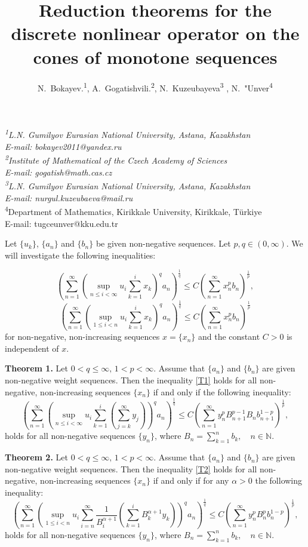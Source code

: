 \documentclass[12pt]{article}
\title{Reduction theorems for the discrete nonlinear operator on the cones of monotone sequences}
\author{ N.~Bokayev.\textsuperscript{1}, A.~Gogatishvili.\textsuperscript{2}, N.~Kuzeubayeva\textsuperscript{3} , N.~"Unver\textsuperscript{4}}
\date{}
\makeatletter
\renewcommand{\maketitle}{%
    \begin{center}
        \Large\@title
        
        \vspace{0.4cm}
        \large\@author
        
        \vspace{0.5cm}
        \normalsize\textit{\textsuperscript{1}L.N. Gumilyov Eurasian National University, Astana, Kazakhstan\\
          E-mail: bokayev2011@yandex.ru\\
          \textsuperscript{2}Institute of Mathematical of the  Czech Academy of Sciences\\
          E-mail: gogatish@math.cas.cz\\
          \textsuperscript{3}L.N. Gumilyov Eurasian National University, Astana, Kazakhstan\\
          E-mail: nurgul.kuzeubaeva@mail.ru\\}
          \textsuperscript{4}Department of Mathematics, Kirikkale University, Kirikkale, T\" urkiye\\
          E-mail: tugceunver@kku.edu.tr\\
    \end{center}
}
\makeatother
\begin{document}
\maketitle


Let $\{u_k\}$,  $\{a_n\}$ and $\{b_n\}$ be given
non-negative sequences. Let $p, q\in (0,\infty)$. We will investigate the following inequalities:

\begin{equation}  \label{T1}
\left(\sum_{n=1}^{\infty}
\left(\sup_{n\le i<\infty} u_i\sum^i_{k=1}x_k\right)^q a_n\right)^{\frac{1}{q}} \le C
\left(\sum^\infty_{n=1} x_n ^p b_n\right)^{\frac{1}{p}},
\end{equation}   
\begin{equation}  \label{T2}
\left(\sum_{n=1}^{\infty}
\left(\sup_{1\le i<n} u_i\sum^i_{k=1}x_k\right)^q a_n\right)^{\frac{1}{q}} \le C
\left(\sum^\infty_{n=1} x_n ^p b_n\right)^{\frac{1}{p}}
\end{equation}
for non-negative, non-increasing sequences $x = \{x_n\}$   and the
constant $C > 0$  is independent of $x$. 

\textbf{Theorem 1.}  \label{Eg_1} Let $0<q\leq\infty,\,  1<p<\infty$. Assume that $\{a_n\}$ and $\{b_n\}$ are given
non-negative weight sequences. %
Then the inequality \eqref{T1} holds  for all non-negative, non-increasing sequences $\{x_n\}$ if and only if the following  inequality:
\begin{equation}
    \label{T11}
\left(\sum_{n=1}^\infty\left(\sup_{n\le i<\infty} u_i\sum_{k=1}^i\left(\sum_{j=k}^\infty y_j\right)\right)^q a_n\right)^{\frac{1}{q}}\leq C\left(\sum_{n=1}^\infty y_n^pB_{n+1}^{p-1}B_n b_{n+1}^{1-p}\right)^{\frac{1}{p}}, 
\end{equation}
holds for all non-negative sequences $\{y_n\}$, where  $B_n =\sum^n_{k=1}b_k, \quad n\in {\mathbb N}$.

\begin{theorem} \label{Th4}
\textbf{Theorem 2.}  \label{Eg_1}
Let $0<q\leq\infty,\,  1<p<\infty$. Assume that $\{a_n\}$ and $\{b_n\}$ are given
non-negative weight sequences.%
Then the inequality \eqref{T2} holds  for all non-negative, non-increasing sequences $\{x_n\}$ if and only if for any $\alpha>0$ the following inequality:
\begin{equation}
    \label{T41}
\left(\sum_{n=1}^\infty\left(\sup_{1\le i<n } 
u_i\sum_{i=n}^\infty \frac{1}{B_i^{\alpha+1}}\left(\sum_{k=1}^i  B_k^{\alpha+1}y_k\right)\right)^q a_n\right)^{\frac{1}{q}}\leq C\left(\sum_{n=1}^\infty y_n^pB_{n}^{p} b_{n}^{1-p}\right)^{\frac{1}{p}}, 
\end{equation}
holds for all non-negative sequences $\{y_n\}$, where  $B_n =\sum^n_{k=1}b_k, \quad n\in {\mathbb N}$.

\end{theorem}
\end{document}
